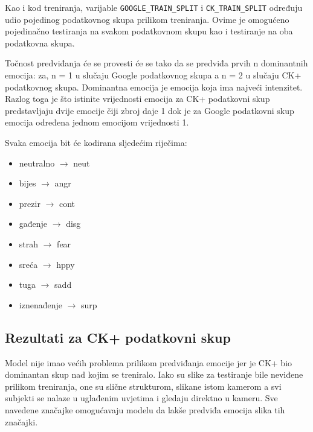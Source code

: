 \documentclass[times, utf8, zavrsni,numeric,pstricks]{fer}
\begin{document}
Kao i kod treniranja, varijable \lstinline"GOOGLE_TRAIN_SPLIT" i \lstinline"CK_TRAIN_SPLIT" određuju udio pojedinog podatkovnog skupa prilikom treniranja. Ovime je omogućeno pojedinačno testiranja na svakom podatkovnom skupu kao i testiranje na oba podatkovna skupa.

Točnost predviđanja će se provesti će se tako da se predviđa prvih n dominantnih emocija:
za, n = 1 u slučaju Google podatkovnog skupa a n = 2 u slučaju CK+ podatkovnog skupa. Dominantna emocija je emocija koja ima najveći intenzitet. Razlog toga je što istinite vrijednosti emocija za CK+ podatkovni skup predstavljaju dvije emocije čiji zbroj daje 1 dok je za Google podatkovni skup emocija određena jednom emocijom vrijednosti 1. 

Svaka emocija bit će kodirana sljedećim riječima:
\begin{itemize}
\item{neutralno $\rightarrow$ neut}
\item{bijes $\rightarrow$ angr}
\item{prezir $\rightarrow$ cont}
\item{gađenje $\rightarrow$ disg}
\item{strah $\rightarrow$ fear}
\item{sreća $\rightarrow$ hppy}
\item{tuga $\rightarrow$ sadd}
\item{iznenađenje $\rightarrow$ surp}


\end{itemize}
\subsection{Rezultati za CK+ podatkovni skup}

Model nije imao većih problema prilikom predviđanja emocije jer je CK+ bio dominantan skup nad kojim se treniralo. Iako su slike za testiranje bile neviđene prilikom treniranja, one su slične strukturom, slikane istom kamerom a svi subjekti se nalaze u uglađenim uvjetima i gledaju direktno u kameru. Sve navedene značajke omogućavaju modelu da lakše predviđa emocija slika tih značajki. 
\end{document}
